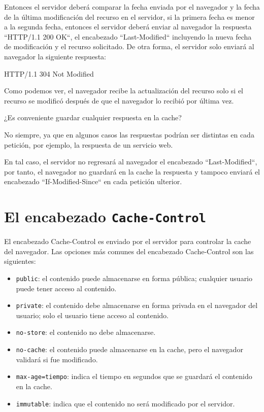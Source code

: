 \documentclass[11pt,a4paper,oneside]{book}
\begin{document}
Entonces el servidor deberá comparar la fecha enviada por el navegador y la fecha de la última modificación del recurso en el servidor, si la primera fecha es menor a la segunda fecha, entonces el servidor deberá enviar al navegador la respuesta ``HTTP/1.1 200 OK``, el encabezado ``Last-Modified`` incluyendo la nueva fecha de modificación y el recurso solicitado. De otra forma, el servidor solo enviará al navegador la siguiente respuesta:

\begin{SourceCode}
HTTP/1.1 304 Not Modified
\end{SourceCode}

Como podemos ver, el navegador recibe la actualización del recurso solo si el recurso se modificó después de que el navegador lo recibió por última vez.

¿Es conveniente guardar cualquier respuesta en la cache?

No siempre, ya que en algunos casos las respuestas podrían ser distintas en cada petición, por ejemplo, la respuesta de un servicio web.

En tal caso, el servidor no regresará al navegador el encabezado ``Last-Modified``, por tanto, el navegador no guardará en la cache la respuesta y tampoco enviará el encabezado ``If-Modified-Since`` en cada petición ulterior.

\section{El encabezado \texttt{Cache-Control}}

El encabezado Cache-Control es enviado por el servidor para controlar la cache del navegador.
Las opciones más comunes del encabezado Cache-Control son las siguientes:

\begin{itemize}

\item \texttt{public}: el contenido puede almacenarse en forma pública; cualquier usuario puede tener acceso al contenido.

\item \texttt{private}: el contenido debe almacenarse en forma privada en el navegador del usuario; solo el usuario tiene acceso al contenido.

\item \texttt{no-store}: el contenido no debe almacenarse.

\item \texttt{no-cache}: el contenido puede almacenarse en la cache, pero el navegador validará si fue modificado.

\item \texttt{max-age=tiempo}: indica el tiempo en segundos que se guardará el contenido en la cache.

\item \texttt{immutable}: indica que el contenido no será modificado por el servidor.

\end{itemize}
\end{document}
